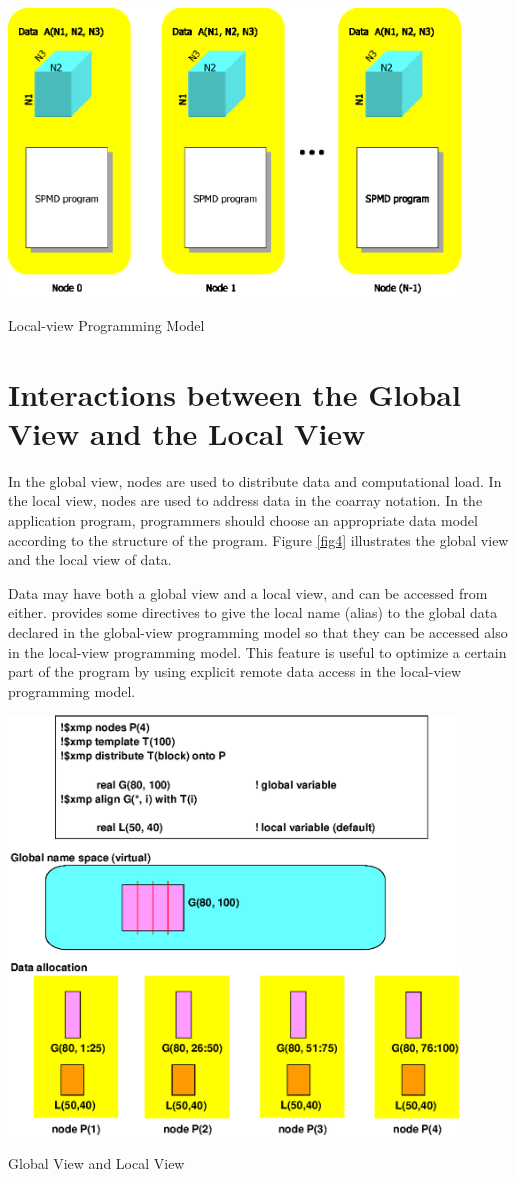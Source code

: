 \begin{myfigure}
\includegraphics[width=12cm]{figs/Fig3.eps}
  \caption{Local-view Programming Model}
\label{fig3}
\end{myfigure}

\section{Interactions between the Global View and the Local View}

In the global view, nodes are used to distribute data and computational
load. In the local view, nodes are used to address data in the coarray
notation.
%
In the application program,
programmers should choose an appropriate data model according to the
structure of the program. Figure \ref{fig4} illustrates the global view
and the local view of data.

Data may have both a global view and a local view, and can be accessed
from either. {\XMP} provides some directives to give the local name
(alias) to the global data declared in the global-view programming model
so that they can be accessed also in the local-view programming
model. This feature is useful to optimize a certain part of the program
by using explicit remote data access in the local-view programming
model.

\begin{myfigure}
\includegraphics[width=12cm]{figs/Fig4.eps}
  \caption{Global View and Local View}
\label{fig4}
\end{myfigure}

